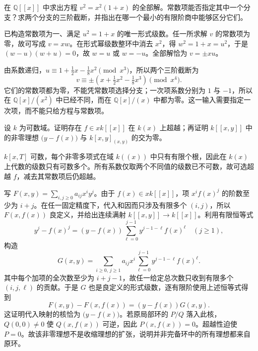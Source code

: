 \begin{exercise}\label{b3:ex:13-formal-nonlinear-root}
	在 \(\mathbb Q[\![x]\!]\) 中求出方程 \(v^2=x^2(1+x)\) 的全部解。常数项能否指定其中一个分支？求两个分支的三阶截断，并指出在哪一个最小的有限阶商中能够区分它们。
\end{exercise}
\begin{solution}
	已构造常数项为一、满足 \(u^2=1+x\) 的唯一形式级数。任一所求解 \(v\) 的常数项为零，故可写成 \(v=xw\)。在形式幂级数整环中消去 \(x^2\)，得 \(w^2=1+x=u^2\)，于是 \((w-u)(w+u)=0\)，故 \(w=u\) 或 \(w=-u\)。全部解恰为 \(v=\pm xu\)。

	由系数递归，\(u\equiv1+\tfrac12x-\tfrac18x^2\pmod{x^3}\)，所以两个三阶截断为
	\[
		v\equiv\pm\left(x+\tfrac12x^2-\tfrac18x^3\right)\pmod{x^4}.
	\]
	它们的常数项都为零，不能凭常数项选择分支；一次项系数分别为 \(1\) 与 \(-1\)，所以在 \(\mathbb Q[x]/(x^2)\) 中已经不同，而在 \(\mathbb Q[x]/(x)\) 中都为零。这一输入需要指定一次项，而不能只给方程与常数项。
\end{solution}

\begin{optionalexercise}\label{b3:ex:13-nonextended-ideal}
	设 \(k\) 为可数域。证明存在 \(f\in xk[\![x]\!]\) 在 \(k(x)\) 上超越；再证明 \(k[\![x,y]\!]\) 中的非零理想 \(\bigl(y-f(x)\bigr)\) 与 \(k[x,y]_{(x,y)}\) 的交为零。
\end{optionalexercise}
\begin{solution}
	\(k[x,T]\) 可数，每个非零多项式在域 \(k(\!(x)\!)\) 中只有有限个根，因此在 \(k(x)\) 上代数的级数只有可数多个。所有系数仅取两个不同值的级数已不可数，故可选超越 \(f\)，减去其常数项后仍超越。

	写 \(F(x,y)=\sum_{i,j\ge0}a_{ij}x^iy^j\)。由于 \(f(x)\in xk[\![x]\!]\)，项 \(x^if(x)^j\) 的阶数至少为 \(i+j\)。在任一固定精度下，代入和因而只涉及有限多个 \((i,j)\)，所以 \(F(x,f(x))\) 良定义，并给出连续满射 \(k[\![x,y]\!]\rightarrow k[\![x]\!]\)。利用有限恒等式
	\[
		y^j-f(x)^j=(y-f(x))\sum_{\ell=0}^{j-1}y^{j-1-\ell}f(x)^\ell \quad(j\ge1),
	\]
	构造
	\[
		G(x,y)=\sum_{i\ge0,\,j\ge1}a_{ij}x^i \sum_{\ell=0}^{j-1}y^{j-1-\ell}f(x)^\ell.
	\]
	其中每个加项的全次数至少为 \(i+j-1\)，故任一给定总次数只收到有限多个 \((i,j,\ell)\) 的贡献。于是 \(G\) 也是良定义的形式级数，逐有限阶使用上述恒等式得到
	\[
		F(x,y)-F(x,f(x))=(y-f(x))G(x,y).
	\]
	这证明代入映射的核恰为 \(\bigl(y-f(x)\bigr)\)。若原局部环的 \(P/Q\) 落入此核，\(Q(0,0)\ne0\) 使 \(Q(x,f(x))\) 可逆，因此 \(P(x,f(x))=0\)。超越性迫使 \(P=0\)。故该非零理想不是收缩理想的扩张，说明并非完备环中的所有理想都来自原环。
\end{solution}
